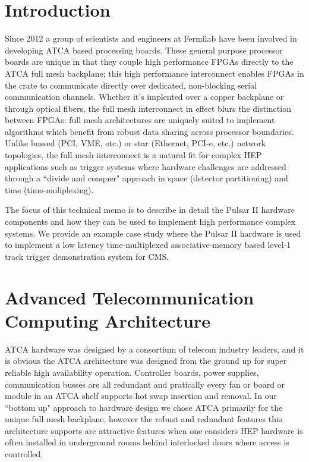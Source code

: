 \documentclass[letterpaper]{article}
\begin{document}
\newpage
\tableofcontents

\listoffigures
\listoftables


\newpage
\section{Introduction}

Since 2012 a group of scientists and engineers at Fermilab\cite{fnal} have been involved in developing ATCA based processing boards.  These general purpose processor boards are unique in that they couple high performance FPGAs directly to the ATCA full mesh backplane; this high performance interconnect enables FPGAs in the crate to communicate directly over dedicated, non-blocking serial communication channels. Whether it's implented over a copper backplane or through optical fibers, the full mesh interconnect in effect blurs the distinction between FPGAs: full mesh architectures are uniquely suited to implement algorithms which benefit from robust data sharing across processor boundaries. Unlike bussed (PCI, VME, etc.) or star (Ethernet, PCI-e, etc.) network topologies, the full mesh interconnect is a natural fit for complex HEP applications such as trigger systems where hardware challenges are addressed through a ``divide and conquer" approach in space (detector partitioning) and time (time-muliplexing).

The focus of this technical memo is to describe in detail the Pulsar II hardware components and how they can be used to implement high performance complex systems.  We provide an example case study where the Pulsar II hardware is used to implement a low latency time-multiplexed associative-memory based level-1 track trigger demonstration system for CMS.


\section{Advanced Telecommunication Computing Architecture}

ATCA hardware was designed by a consortium of telecom industry leaders, and it is obvious the ATCA architecture was designed from the ground up for super reliable high availability operation.  Controller boards, power supplies, communication busses are all redundant and pratically every fan or board or module in an ATCA shelf supports hot swap insertion and removal.  In our ``bottom up" approach to hardware design we chose ATCA primarily for the unique full mesh backplane, however the robust and redundant features this architecture supports are attractive features when one considers HEP hardware is often installed in underground rooms behind interlocked doors where access is controlled.
\end{document}
